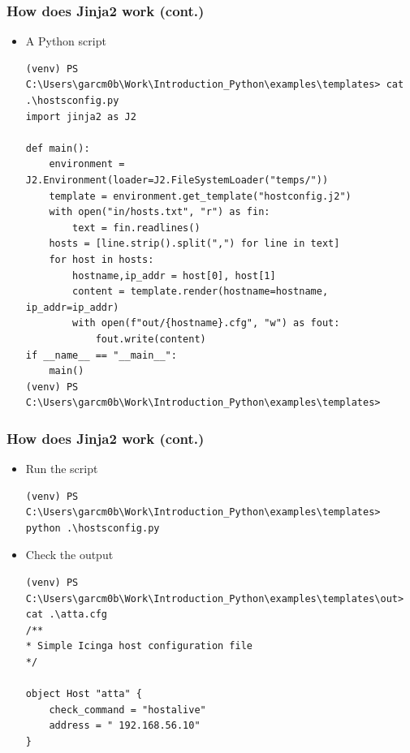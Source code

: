 \documentclass[aspectratio=169]{beamer}
\begin{document}
\begin{frame}[fragile]
\frametitle{How does Jinja2 work (cont.)}
\begin{itemize}
    \item A Python script
    \tiny
    \begin{verbatim}
(venv) PS C:\Users\garcm0b\Work\Introduction_Python\examples\templates> cat .\hostsconfig.py
import jinja2 as J2

def main():
    environment = J2.Environment(loader=J2.FileSystemLoader("temps/"))
    template = environment.get_template("hostconfig.j2")
    with open("in/hosts.txt", "r") as fin:
        text = fin.readlines()
    hosts = [line.strip().split(",") for line in text]
    for host in hosts:
        hostname,ip_addr = host[0], host[1]
        content = template.render(hostname=hostname, ip_addr=ip_addr)
        with open(f"out/{hostname}.cfg", "w") as fout:
            fout.write(content)
if __name__ == "__main__":
    main()
(venv) PS C:\Users\garcm0b\Work\Introduction_Python\examples\templates>        
    \end{verbatim}
    \normalsize
\end{itemize}
\end{frame}

\begin{frame}[fragile]
\frametitle{How does Jinja2 work (cont.)}
\begin{itemize}
    \item Run the script
    \tiny
    \begin{verbatim}
(venv) PS C:\Users\garcm0b\Work\Introduction_Python\examples\templates> python .\hostsconfig.py        
    \end{verbatim}
    \normalsize
    \item Check the output
    \tiny
    \begin{verbatim}
(venv) PS C:\Users\garcm0b\Work\Introduction_Python\examples\templates\out> cat .\atta.cfg
/**
* Simple Icinga host configuration file
*/

object Host "atta" {
    check_command = "hostalive"
    address = " 192.168.56.10"
}
    \end{verbatim}
\end{itemize}
    
\end{frame}
%
%
\end{document}
